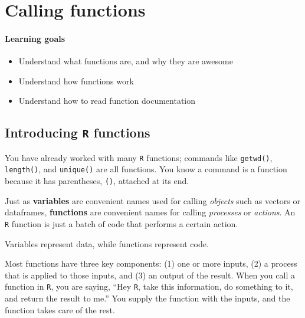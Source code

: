 \documentclass[
]{book}
\providecommand{\tightlist}{%
  \setlength{\itemsep}{0pt}\setlength{\parskip}{0pt}}
\begin{document}
\hypertarget{calling_functions}{%
\chapter{Calling functions}\label{calling_functions}}

\hypertarget{learning-goals-4}{%
\subsubsection*{Learning goals}\label{learning-goals-4}}

\begin{itemize}
\tightlist
\item
  Understand what functions are, and why they are awesome
\item
  Understand how functions work
\item
  Understand how to read function documentation
\end{itemize}

\hypertarget{introducing-r-functions}{%
\section*{\texorpdfstring{Introducing \texttt{R} functions}{Introducing R functions}}\label{introducing-r-functions}}

You have already worked with many \texttt{R} functions; commands like \texttt{getwd()}, \texttt{length()}, and \texttt{unique()} are all functions. You know a command is a function because it has parentheses, \texttt{()}, attached at its end.

Just as \textbf{variables} are convenient names used for calling \emph{objects} such as vectors or dataframes, \textbf{functions} are convenient names for calling \emph{processes} or \emph{actions}. An \texttt{R} function is just a batch of code that performs a certain action.

Variables represent data, while functions represent code.

Most functions have three key components: (1) one or more inputs, (2) a process that is applied to those inputs, and (3) an output of the result. When you call a function in \texttt{R}, you are saying, ``Hey \texttt{R}, take this information, do something to it, and return the result to me.'' You supply the function with the inputs, and the function takes care of the rest.
\end{document}
